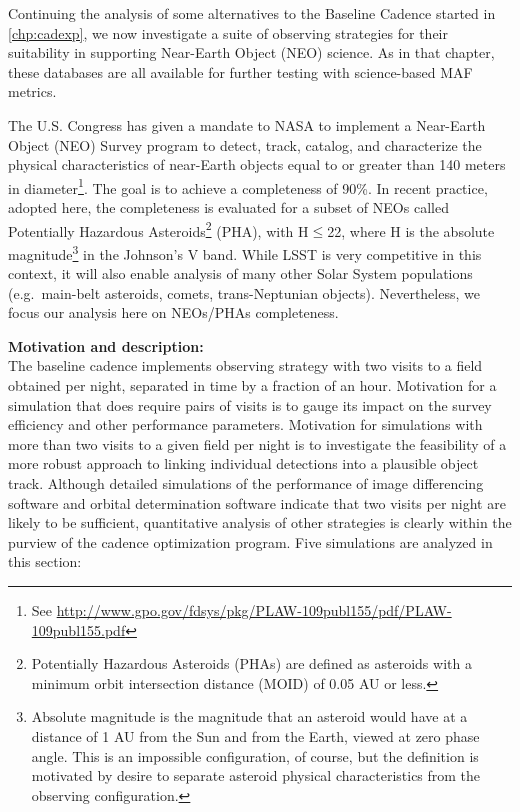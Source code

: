 
Continuing the analysis of some alternatives to the Baseline Cadence
started in \autoref{chp:cadexp},
we now investigate a suite of observing strategies for their
suitability in supporting Near-Earth Object (NEO) science. As in
that chapter,
these \OpSim databases are all available for further
testing with science-based MAF metrics.

The U.S. Congress has given a mandate to NASA to implement a
Near-Earth Object (NEO) Survey program to detect, track, catalog,
and characterize the physical characteristics of near-Earth objects
equal to or greater than 140 meters in diameter\footnote{See
\url{http://www.gpo.gov/fdsys/pkg/PLAW-109publ155/pdf/PLAW-109publ155.pdf}}.
The goal is to achieve a completeness of 90\%. In recent practice,
adopted here, the completeness is evaluated for a subset of NEOs
called Potentially Hazardous Asteroids\footnote{Potentially Hazardous
Asteroids (PHAs) are defined as asteroids with a minimum orbit
intersection distance (MOID) of 0.05 AU or less.}  (PHA), with
H$\le$22, where H is the absolute magnitude\footnote{Absolute
magnitude is the magnitude that an asteroid would have at a distance
of 1 AU from the Sun and from the Earth, viewed at zero phase angle.
This is an impossible configuration, of course, but the definition is
motivated by desire to separate asteroid physical characteristics from
the observing configuration.} in the Johnson's V band. While LSST is
very competitive in this context, it will also enable analysis of many
other Solar System populations (e.g.\ main-belt asteroids, comets,
trans-Neptunian objects). Nevertheless, we focus our analysis here on
NEOs/PHAs completeness.


{\bf Motivation and description:}\\
The baseline cadence implements observing strategy with two visits to
a field obtained per night, separated in time by a fraction of an
hour. Motivation for a simulation that does require pairs of visits is
to gauge its impact on the survey efficiency and other performance
parameters. Motivation for simulations with more than two visits to a
given field per night is to investigate the feasibility of a more
robust approach to linking individual detections into a plausible
object track. Although detailed simulations of the performance of
image differencing software and orbital determination software
indicate that two visits per night are likely to be sufficient,
quantitative analysis of other strategies is clearly within the
purview of the cadence optimization program.  Five simulations are
analyzed in this section:


